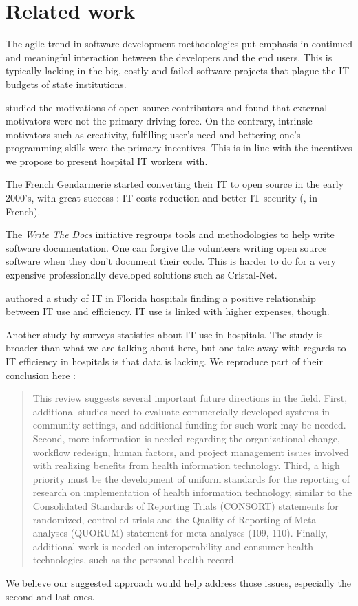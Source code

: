 \documentclass[nobib]{tufte-handout}
\begin{document}
\section{Related work}
\label{sec:related}

The agile trend in software development methodologies \cite{martin2003agile} put emphasis in continued and meaningful interaction between the developers and the end users. This is typically lacking in the big, costly and failed software projects that plague the IT budgets of state institutions.

\citet{lakhani2005hackers} studied the motivations of open source contributors and found that external motivators were not the primary driving force. On the contrary, intrinsic motivators such as creativity, fulfilling user's need and bettering one's programming skills were the primary incentives. This is in line with the incentives we propose to present hospital IT workers with.

The French Gendarmerie started converting their IT to open source in the early 2000's, with great success : IT costs reduction and better IT security (\cite{zdnet}, in French).

The \emph{Write The Docs} \cite{wtd} initiative regroups tools and methodologies to help write software documentation. One can forgive the volunteers writing open source software when they don't document their code. This is harder to do for a very expensive professionally developed solutions such as Cristal-Net.

\citet{menachemi2005hospital} authored a study of IT in Florida hospitals finding a positive relationship between IT use and efficiency. IT use is linked with higher expenses, though.

Another study by \citet{chaudhry2006systematic} surveys statistics about IT use in hospitals. The study is broader than what we are talking about here, but one take-away with regards to IT efficiency in hospitals is that data is lacking.  We reproduce part of their conclusion here :
\begin{quote}
This review suggests several important future directions in the field. First, additional studies need to evaluate commercially developed systems in community settings, and additional funding for such work may be needed. Second, more information is needed regarding the organizational change, workflow redesign, human factors, and project management issues involved with realizing benefits from health information technology. Third, a high priority must be the development of uniform standards for the reporting of research on implementation of health information technology, similar to the Consolidated Standards of Reporting Trials (CONSORT) statements for randomized, controlled trials and the Quality of Reporting of Meta-analyses (QUORUM) statement for meta-analyses (109, 110). Finally, additional work is needed on interoperability and consumer health technologies, such as the personal health record.
\end{quote}
We believe our suggested approach would help address those issues, especially the second and last ones.
\end{document}
